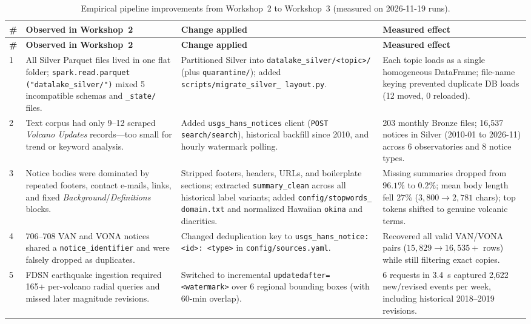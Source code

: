 \documentclass[11pt,a4paper]{article}
\begin{document}
\begin{longtable}{L{0.5cm}L{4.4cm}L{4.8cm}L{4.6cm}}
\caption{Empirical pipeline improvements from Workshop~2 to Workshop~3 (measured on 2026-11-19 runs).}\label{tab:before_after}\\
\toprule
\textbf{\#} & \textbf{Observed in Workshop~2} & \textbf{Change applied} & \textbf{Measured effect}\\
\midrule
\endfirsthead
\toprule
\textbf{\#} & \textbf{Observed in Workshop~2} & \textbf{Change applied} & \textbf{Measured effect}\\
\midrule
{} & All Silver Parquet files lived in one flat folder; \texttt{spark.read.parquet ("datalake\_silver/")} mixed 5 incompatible schemas and \texttt{\_state/} files. & Partitioned Silver into \texttt{datalake\_silver/<topic>/} (plus \texttt{quarantine/}); added \texttt{scripts/migrate\_silver\_ layout.py}. & Each topic loads as a single homogeneous DataFrame; file-name keying prevented duplicate DB loads (12 moved, 0 reloaded).\\
2 & Text corpus had only 9--12 scraped \emph{Volcano Updates} records---too small for trend or keyword analysis. & Added \texttt{usgs\_hans\_notices} client (\texttt{POST search/search}), historical backfill since 2010, and hourly watermark polling. & 203 monthly Bronze files; 16,537 notices in Silver (2010-01 to 2026-11) across 6 observatories and 8 notice types.\\
3 & Notice bodies were dominated by repeated footers, contact e-mails, links, and fixed \emph{Background}/\emph{Definitions} blocks. & Stripped footers, headers, URLs, and boilerplate sections; extracted \texttt{summary\_clean} across all historical label variants; added \texttt{config/stopwords\_ domain.txt} and normalized Hawaiian \texttt{okina} and diacritics. & Missing summaries dropped from $96.1\%$ to $0.2\%$; mean body length fell $27\%$ ($3,800 \to 2,781$ chars); top tokens shifted to genuine volcanic terms.\\
4 & 706--708 VAN and VONA notices shared a \texttt{notice\_identifier} and were falsely dropped as duplicates. & Changed deduplication key to \texttt{usgs\_hans\_notice:<id>: <type>} in \texttt{config/sources.yaml}. & Recovered all valid VAN/VONA pairs ($15,829 \to 16,535+$ rows) while still filtering exact copies.\\
5 & FDSN earthquake ingestion required 165+ per-volcano radial queries and missed later magnitude revisions. & Switched to incremental \texttt{updatedafter=<watermark>} over 6 regional bounding boxes (with 60-min overlap). & 6 requests in 3.4~s captured 2,622 new/revised events per week, including historical 2018--2019 revisions.\\

\end{longtable}
\end{document}

